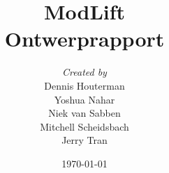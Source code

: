 \documentclass{article}
\begin{document}
\title{\Huge{ModLift} \\ \large{Ontwerprapport}}
\author{
\textit{Created by}\\
Dennis Houterman\\
Yoshua Nahar\\
Niek van Sabben\\
Mitchell Scheidsbach\\
Jerry Tran
}
\date{\today}
\begin{titlepage}
\maketitle
\end{titlepage}
\tableofcontents
\newpage



\end{document}

